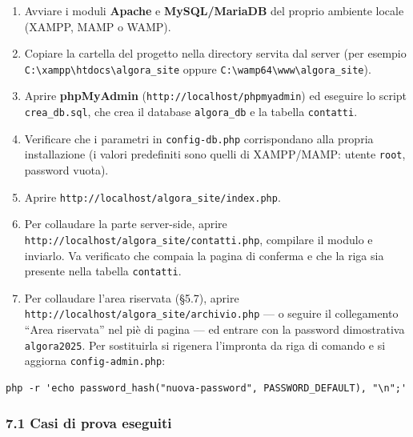 \documentclass[
  11pt,
]{article}
\providecommand{\tightlist}{%
  \setlength{\itemsep}{0pt}\setlength{\parskip}{0pt}}
\begin{document}
\begin{enumerate}
\def\labelenumi{\arabic{enumi}.}
\tightlist
\item
  Avviare i moduli \textbf{Apache} e \textbf{MySQL/MariaDB} del proprio
  ambiente locale (XAMPP, MAMP o WAMP).
\item
  Copiare la cartella del progetto nella directory servita dal server
  (per esempio
  \texttt{C:\textbackslash{}xampp\textbackslash{}htdocs\textbackslash{}algora\_site}
  oppure
  \texttt{C:\textbackslash{}wamp64\textbackslash{}www\textbackslash{}algora\_site}).
\item
  Aprire \textbf{phpMyAdmin} (\texttt{http://localhost/phpmyadmin}) ed
  eseguire lo script \texttt{crea\_db.sql}, che crea il database
  \texttt{algora\_db} e la tabella \texttt{contatti}.
\item
  Verificare che i parametri in \texttt{config-db.php} corrispondano
  alla propria installazione (i valori predefiniti sono quelli di
  XAMPP/MAMP: utente \texttt{root}, password vuota).
\item
  Aprire \texttt{http://localhost/algora\_site/index.php}.
\item
  Per collaudare la parte server-side, aprire
  \texttt{http://localhost/algora\_site/contatti.php}, compilare il
  modulo e inviarlo. Va verificato che compaia la pagina di conferma e
  che la riga sia presente nella tabella \texttt{contatti}.
\item
  Per collaudare l'area riservata (§5.7), aprire
  \texttt{http://localhost/algora\_site/archivio.php} --- o seguire il
  collegamento ``Area riservata'' nel piè di pagina --- ed entrare con
  la password dimostrativa \texttt{algora2025}. Per sostituirla si
  rigenera l'impronta da riga di comando e si aggiorna
  \texttt{config-admin.php}:
\end{enumerate}

\begin{verbatim}
php -r 'echo password_hash("nuova-password", PASSWORD_DEFAULT), "\n";'
\end{verbatim}

\hypertarget{casi-di-prova-eseguiti}{%
\subsubsection{7.1 Casi di prova
eseguiti}\label{casi-di-prova-eseguiti}}
\end{document}
